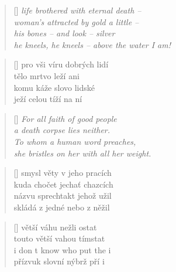 \documentclass[a4]{article}
\begin{document}
\settowidth{\versewidth}{Than Tycho Brahe, or Erra Pater:}
\begin{verse}[\versewidth]
\it
life brothered with eternal death -- \\
woman's attracted by gold a little -- \\
his bones -- and look -- silver\\
he kneels, he kneels -- above the water I am!\\
\end{verse}


\settowidth{\versewidth}{Than Tycho Brahe, or Erra Pater:}
\begin{verse}[\versewidth]
pro  vši  víru  dobrých  lidí \\
tělo  mrtvo  leží  ani \\
komu  káže  slovo  lidské \\
ježí  celou  tíží  na  ní \\
\end{verse}

\settowidth{\versewidth}{Than Tycho Brahe, or Erra Pater:}
\begin{verse}[\versewidth]
\it
For all faith of good people\\
a death corpse lies neither.\\
To whom a human word preaches,\\
she bristles on her with all her weight.\\
\end{verse}






\settowidth{\versewidth}{Than Tycho Brahe, or Erra Pater:}
\begin{verse}[\versewidth]
smysl  věty  v jeho  pracích \\
kuda  chočet  jechať  chazcích \\
názvu  sprechtakt  jehož  užil \\
skládá  z jedné  nebo  z něžil\\
\end{verse}

\settowidth{\versewidth}{Than Tycho Brahe, or Erra Pater:}
\begin{verse}[\versewidth]
větší  váhu  nežli  ostat\\
touto  větší  vahou  tímstat\\
i  don  t  know  who  put  the  i \\
přízvuk  slovní  nýbrž  pří i \\
\end{verse}
\end{document}
